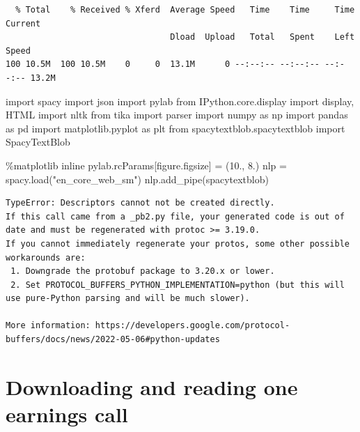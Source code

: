 \documentclass[
  letterpaper,
  DIV=11,
  numbers=noendperiod]{scrreprt}
\newenvironment{Shaded}{\begin{snugshade}}{\end{snugshade}}
\newcommand{\FloatTok}[1]{\textcolor[rgb]{0.68,0.00,0.00}{#1}}
\newcommand{\ImportTok}[1]{\textcolor[rgb]{0.00,0.46,0.62}{#1}}
\newcommand{\NormalTok}[1]{\textcolor[rgb]{0.00,0.23,0.31}{#1}}
\newcommand{\OperatorTok}[1]{\textcolor[rgb]{0.37,0.37,0.37}{#1}}
\newcommand{\StringTok}[1]{\textcolor[rgb]{0.13,0.47,0.30}{#1}}
\begin{document}
\begin{verbatim}
  % Total    % Received % Xferd  Average Speed   Time    Time     Time  Current
                                 Dload  Upload   Total   Spent    Left  Speed
100 10.5M  100 10.5M    0     0  13.1M      0 --:--:-- --:--:-- --:--:-- 13.2M
\end{verbatim}

\begin{Shaded}
\begin{Highlighting}[]
\ImportTok{import}\NormalTok{ spacy}
\ImportTok{import}\NormalTok{ json}
\ImportTok{import}\NormalTok{ pylab}
\ImportTok{from}\NormalTok{ IPython.core.display }\ImportTok{import}\NormalTok{ display, HTML}
\ImportTok{import}\NormalTok{ nltk}
\ImportTok{from}\NormalTok{ tika }\ImportTok{import}\NormalTok{ parser}
\ImportTok{import}\NormalTok{ numpy }\ImportTok{as}\NormalTok{ np}
\ImportTok{import}\NormalTok{ pandas }\ImportTok{as}\NormalTok{ pd}
\ImportTok{import}\NormalTok{ matplotlib.pyplot }\ImportTok{as}\NormalTok{ plt}
\ImportTok{from}\NormalTok{ spacytextblob.spacytextblob }\ImportTok{import}\NormalTok{ SpacyTextBlob}

\OperatorTok{\%}\NormalTok{matplotlib inline}
\NormalTok{pylab.rcParams[}\StringTok{\textquotesingle{}figure.figsize\textquotesingle{}}\NormalTok{] }\OperatorTok{=}\NormalTok{ (}\FloatTok{10.}\NormalTok{, }\FloatTok{8.}\NormalTok{)}
\NormalTok{nlp }\OperatorTok{=}\NormalTok{ spacy.load(}\StringTok{"en\_core\_web\_sm"}\NormalTok{)}
\NormalTok{nlp.add\_pipe(}\StringTok{\textquotesingle{}spacytextblob\textquotesingle{}}\NormalTok{)}
\end{Highlighting}
\end{Shaded}

\begin{verbatim}
TypeError: Descriptors cannot not be created directly.
If this call came from a _pb2.py file, your generated code is out of date and must be regenerated with protoc >= 3.19.0.
If you cannot immediately regenerate your protos, some other possible workarounds are:
 1. Downgrade the protobuf package to 3.20.x or lower.
 2. Set PROTOCOL_BUFFERS_PYTHON_IMPLEMENTATION=python (but this will use pure-Python parsing and will be much slower).

More information: https://developers.google.com/protocol-buffers/docs/news/2022-05-06#python-updates
\end{verbatim}

\hypertarget{downloading-and-reading-one-earnings-call}{%
\section{Downloading and reading one earnings
call}\label{downloading-and-reading-one-earnings-call}}
\end{document}

